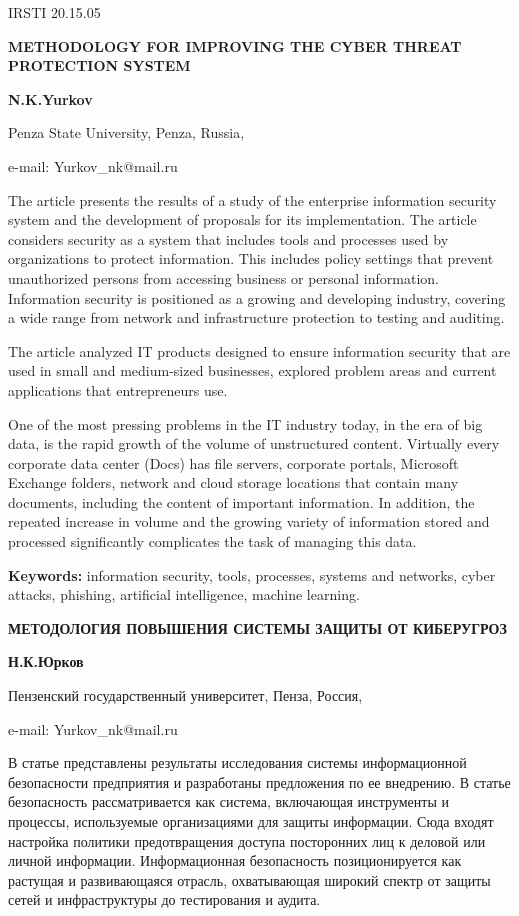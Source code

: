 IRSTI 20.15.05

{\bfseries METHODOLOGY FOR IMPROVING THE CYBER THREAT PROTECTION SYSTEM}

{\bfseries N.K.Yurkov}

Penza State University, Penza, Russia,

e-mail: Yurkov\_nk@mail.ru

The article presents the results of a study of the enterprise
information security system and the development of proposals for its
implementation. The article considers security as a system that includes
tools and processes used by organizations to protect information. This
includes policy settings that prevent unauthorized persons from
accessing business or personal information. Information security is
positioned as a growing and developing industry, covering a wide range
from network and infrastructure protection to testing and auditing.

The article analyzed IT products designed to ensure information security
that are used in small and medium-sized businesses, explored problem
areas and current applications that entrepreneurs use.

One of the most pressing problems in the IT industry today, in the era
of big data, is the rapid growth of the volume of unstructured content.
Virtually every corporate data center (Docs) has file servers, corporate
portals, Microsoft Exchange folders, network and cloud storage locations
that contain many documents, including the content of important
information. In addition, the repeated increase in volume and the
growing variety of information stored and processed significantly
complicates the task of managing this data.

{\bfseries Keywords:} information security, tools, processes, systems and
networks, cyber attacks, phishing, artificial intelligence, machine
learning.

{\bfseries МЕТОДОЛОГИЯ ПОВЫШЕНИЯ СИСТЕМЫ ЗАЩИТЫ ОТ КИБЕРУГРОЗ}

{\bfseries Н.К.Юрков}

Пензенский государственный университет, Пенза, Россия,

e-mail: Yurkov\_nk@mail.ru

В статье представлены результаты исследования системы информационной
безопасности предприятия и разработаны предложения по ее внедрению. В
статье безопасность рассматривается как система, включающая инструменты
и процессы, используемые организациями для защиты информации. Сюда
входят настройка политики предотвращения доступа посторонних лиц к
деловой или личной информации. Информационная безопасность
позиционируется как растущая и развивающаяся отрасль, охватывающая
широкий спектр от защиты сетей и инфраструктуры до тестирования и
аудита.


